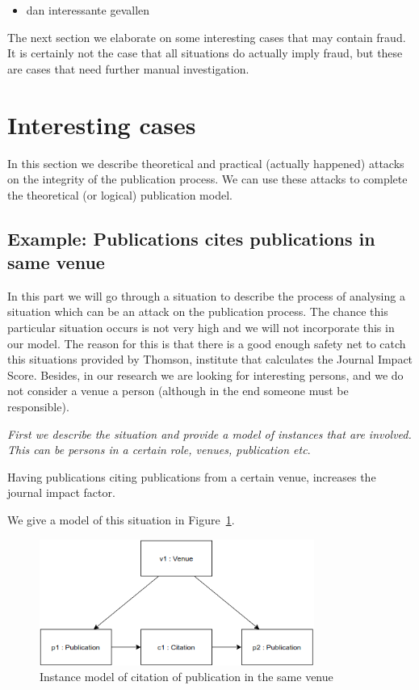 \documentclass{ou-report}
\newcommand{\outline}[1]{{\color{blue} #1}}
\begin{document}
\outline{
\begin{itemize}
    \item dan interessante gevallen
\end{itemize}
}
The next section we elaborate on some interesting cases that may contain fraud.
It is certainly not the case that all situations do actually imply fraud, but 
these are cases that need further manual investigation.


\section{Interesting cases}
\label{interesting_cases}
In this section we describe theoretical and practical (actually happened) 
attacks on the integrity of the publication process. We can use these attacks to 
complete the theoretical (or logical) publication model.

\subsection{Example: Publications cites publications in same venue}
In this part we will go through a situation to describe the process of analysing
a situation which can be an attack on the publication process. The chance this 
particular situation occurs is not very high and we will
not incorporate this in our model. The reason for this is that there is a good
enough safety net to catch this situations provided by Thomson, institute that 
calculates the Journal Impact Score. Besides, in our research we are looking for
interesting persons, and we do not consider a venue a person (although in the
end someone must be responsible).

\textit{First we describe the situation and provide a model of instances that 
are involved. This can be persons in a certain role, venues, publication etc}.

Having publications citing publications from a certain venue, increases the 
journal impact factor.

We give a model of this situation in Figure~\ref{fig:cpsv}.

\begin{figure}[H]
\centering
\includegraphics[width=9cm]{images/cited_publications_same_journal.drawio.png}
\caption{Instance model of citation of publication in the same venue}
\label{fig:cpsv}
\end{figure}
\end{document}
